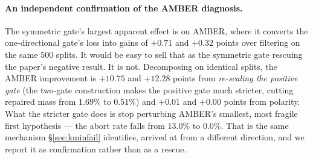 \documentclass[review,number,doubleblind]{elsarticle}
\theoremstyle{plain}
\theoremstyle{definition}
\theoremstyle{remark}
\begin{document}
\paragraph{An independent confirmation of the AMBER diagnosis.}
The symmetric gate's largest apparent effect is on AMBER, where it converts the one-directional
gate's loss into gains of $+0.71$ and $+0.32$ points over filtering on the same $500$ splits. It
would be easy to sell that as the symmetric gate rescuing
the paper's negative result. It is not. Decomposing on identical splits, the AMBER improvement is
$+10.75$ and $+12.28$ points from \emph{re-scaling the positive gate} (the two-gate construction
makes the positive gate much stricter, cutting repaired mass from $1.69\%$ to $0.51\%$) and
$+0.01$ and $+0.00$ points from polarity. What the stricter gate does is stop perturbing AMBER's
smallest, most fragile first hypothesis --- the abort rate falls from $13.0\%$ to $0.0\%$. That is
the same mechanism \S\ref{sec:kminfail} identifies, arrived at from a different direction, and we
report it as confirmation rather than as a rescue.
\end{document}
